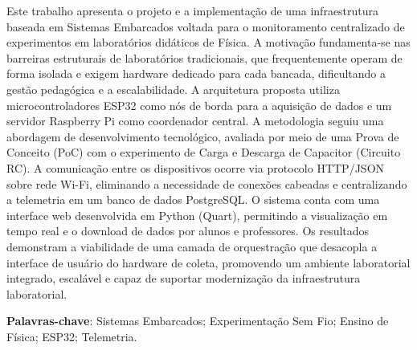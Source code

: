 


Este trabalho apresenta o projeto e a implementação de uma infraestrutura baseada em Sistemas Embarcados voltada para o monitoramento centralizado de experimentos em laboratórios didáticos de Física. A motivação fundamenta-se nas barreiras estruturais de laboratórios tradicionais, que frequentemente operam de forma isolada e exigem hardware dedicado para cada bancada, dificultando a gestão pedagógica e a escalabilidade. A arquitetura proposta utiliza microcontroladores ESP32 como nós de borda para a aquisição de dados e um servidor Raspberry Pi como coordenador central. A metodologia seguiu uma abordagem de desenvolvimento tecnológico, avaliada por meio de uma Prova de Conceito (PoC) com o experimento de Carga e Descarga de Capacitor (Circuito RC). A comunicação entre os dispositivos ocorre via protocolo HTTP/JSON sobre rede Wi-Fi, eliminando a necessidade de conexões cabeadas e centralizando a telemetria em um banco de dados PostgreSQL. O sistema conta com uma interface web desenvolvida em Python (Quart), permitindo a visualização em tempo real e o download de dados por alunos e professores. Os resultados demonstram a viabilidade de uma camada de orquestração que desacopla a interface de usuário do hardware de coleta, promovendo um ambiente laboratorial integrado, escalável e capaz de suportar modernização da infraestrutura laboratorial.

 \textbf{Palavras-chave}: Sistemas Embarcados; Experimentação Sem Fio; Ensino de Física; ESP32; Telemetria.

